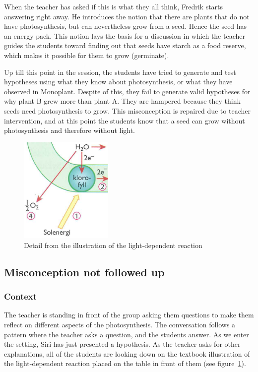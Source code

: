 When the teacher has asked if this is what they all think, Fredrik starts answering right away. He introduces the notion that there are plants that do not have photosynthesis, but can nevertheless grow from a seed. Hence the seed has an energy pack. This notion lays the basis for a discussion in which the teacher guides the students toward finding out that seeds have starch as a food reserve, which makes it possible for them to grow (germinate). 

Up till this point in the session, the students have tried to generate and test hypotheses using what they know about photosynthesis, or what they have observed in Monoplant. Despite of this, they fail to generate valid hypotheses for why plant B grew more than plant A. They are hampered because they think seeds need photosynthesis to grow. This misconception is repaired due to teacher intervention, and at this point the students know that a seed can grow without photosynthesis and therefore without light.

\begin{figure}
\centering
\includegraphics[width=0.4\textwidth]{img/data_analysis/light_dependent_detail.png}
\caption{Detail from the illustration of the light-dependent reaction \citep{bios}}
\label{fig:lightdependentdetail}
\end{figure}

\subsection{Misconception not followed up}

\subsubsection*{Context}
The teacher is standing in front of the group asking them questions to make them reflect on different aspects of the photosynthesis. The conversation follows a pattern where the teacher asks a question, and the students answer. As we enter the setting, Siri has just presented a hypothesis. As the teacher asks for other explanations, all of the students are looking down on the textbook illustration of the light-dependent reaction placed on the table in front of them (see figure~\ref{fig:lightdependentdetail}). 

